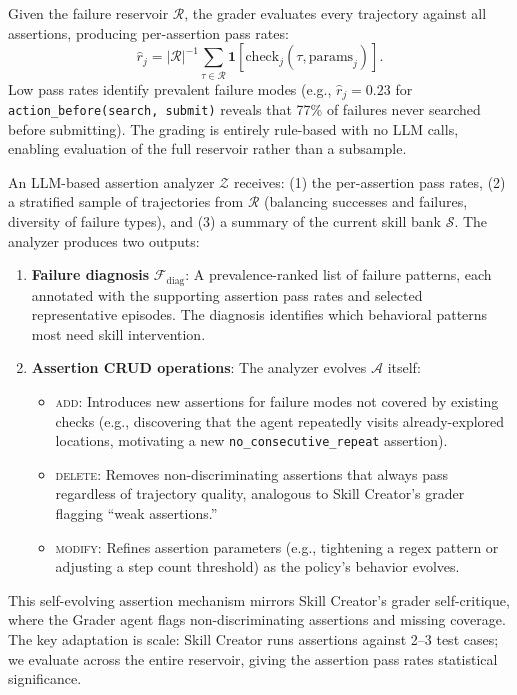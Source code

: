 \documentclass{article}
\theoremstyle{plain}
\theoremstyle{definition}
\theoremstyle{remark}
\begin{document}
Given the failure reservoir $\mathcal{R}$, the grader evaluates every trajectory against all assertions, producing per-assertion pass rates:
\begin{equation}
    \hat{r}_j = |\mathcal{R}|^{-1} \sum_{\tau \in \mathcal{R}} \mathbf{1}[\text{check}_j(\tau, \text{params}_j)].
\end{equation}
Low pass rates identify prevalent failure modes (e.g., $\hat{r}_j = 0.23$ for \texttt{action\_before(search, submit)} reveals that 77\% of failures never searched before submitting). The grading is entirely rule-based with no LLM calls, enabling evaluation of the full reservoir rather than a subsample.

An LLM-based assertion analyzer $\mathcal{Z}$ receives: (1) the per-assertion pass rates, (2) a stratified sample of trajectories from $\mathcal{R}$ (balancing successes and failures, diversity of failure types), and (3) a summary of the current skill bank $\mathcal{S}$. The analyzer produces two outputs:

\begin{enumerate}[itemsep=2pt]
    \item \textbf{Failure diagnosis} $\mathcal{F}_{\text{diag}}$: A prevalence-ranked list of failure patterns, each annotated with the supporting assertion pass rates and selected representative episodes. The diagnosis identifies which behavioral patterns most need skill intervention.
    \item \textbf{Assertion CRUD operations}: The analyzer evolves $\mathcal{A}$ itself:
    \begin{itemize}[itemsep=1pt]
        \item \textsc{add}: Introduces new assertions for failure modes not covered by existing checks (e.g., discovering that the agent repeatedly visits already-explored locations, motivating a new \texttt{no\_consecutive\_repeat} assertion).
        \item \textsc{delete}: Removes non-discriminating assertions that always pass regardless of trajectory quality, analogous to Skill Creator's grader flagging ``weak assertions.''
        \item \textsc{modify}: Refines assertion parameters (e.g., tightening a regex pattern or adjusting a step count threshold) as the policy's behavior evolves.
    \end{itemize}
\end{enumerate}

This self-evolving assertion mechanism mirrors Skill Creator's grader self-critique, where the Grader agent flags non-discriminating assertions and missing coverage. The key adaptation is scale: Skill Creator runs assertions against 2--3 test cases; we evaluate across the entire reservoir, giving the assertion pass rates statistical significance.
\end{document}
